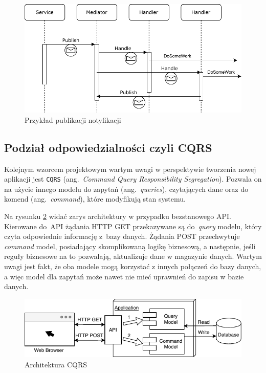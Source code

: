 \begin{figure}[h]
	\centering
	\includegraphics[width=.8\linewidth]{rys02/mediatR-notification-3.pdf}
	\caption{Przykład publikacji notyfikacji}
	\label{fig:mediatR-Event}
\end{figure}

\subsection{Podział odpowiedzialności czyli CQRS}
\label{subsec:cqrs}

Kolejnym wzorcem projektowym wartym uwagi w perspektywie tworzenia nowej aplikacji jest \texttt{CQRS} (ang.~\emph{Command Query Responsibility Segregation}). Pozwala on na użycie innego modelu do zapytań (ang.~\emph{queries}), czytających dane oraz do komend (ang.~\emph{command}), które modyfikują stan systemu. 

Na rysunku \ref{fig:cqrs-architecture} widać zarys architektury w przypadku bezstanowego API. Kierowane do~API żądania HTTP GET przekazywane są do~\emph{query} modelu, który czyta odpowiednie informację z~bazy danych. Żądania POST przechwytuje \emph{command} model, posiadający skomplikowaną logikę biznesową, a następnie, jeśli reguły biznesowe na to pozwalają, aktualizuje dane w magazynie danych. Wartym uwagi jest fakt, że oba modele mogą korzystać z innych połączeń do bazy danych, a więc model dla zapytań może nawet nie mieć uprawnień do zapisu w bazie danych.

\begin{figure}[h]
	\centering
	\includegraphics[width=.9\linewidth]{rys02/cqrs01.pdf}
	\caption{Architektura CQRS}
	\label{fig:cqrs-architecture}
\end{figure}

